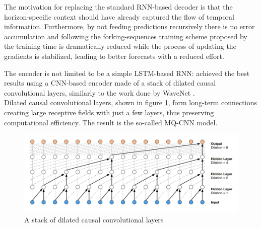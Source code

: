 \documentclass[a4paper, 12pt]{article} %
\begin{document}
	The motivation for replacing the standard RNN-based decoder is that the horizon-specific context should have already captured the flow of temporal information. Furthermore, by not feeding predictions recursively there is no error accumulation and following the forking-sequences training scheme proposed by \cite{MQCNN} the training time is dramatically reduced while the process of updating the gradients is stabilized, leading to better forecasts with a reduced effort.
	
	The encoder is not limited to be a simple LSTM-based RNN: \cite{MQCNN} achieved the best results using a CNN-based encoder made of a stack of dilated causal convolutional layers, similarly to the work done by WaveNet \cite{Wavenet}.\\
	Dilated causal convolutional layers, shown in figure \ref{fig:dilated_cnn}, form long-term connections creating large receptive fields with just a few layers, thus preserving computational efficiency. The result is the so-called MQ-CNN model.
	\begin{figure}
		\includegraphics[width=\linewidth]{img/wavenet.png}
		\caption{A stack of dilated causal convolutional layers}
		\label{fig:dilated_cnn}
	\end{figure}
	
	
\end{document}
